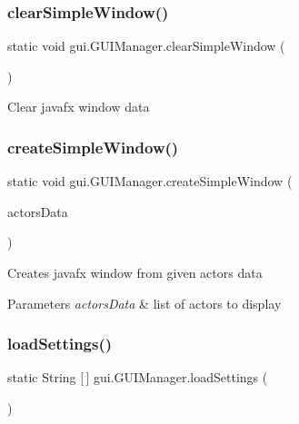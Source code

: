 \subsubsection{\texorpdfstring{clear\+Simple\+Window()}{clearSimpleWindow()}}
{\footnotesize\ttfamily static void gui.\+G\+U\+I\+Manager.\+clear\+Simple\+Window (\begin{DoxyParamCaption}{ }\end{DoxyParamCaption})\hspace{0.3cm}{\ttfamily [static]}}

Clear javafx window data \mbox{\label{classgui_1_1_g_u_i_manager_ad0f98411aba9a8fe15a3965bee9a004d}} 
\subsubsection{\texorpdfstring{create\+Simple\+Window()}{createSimpleWindow()}}
{\footnotesize\ttfamily static void gui.\+G\+U\+I\+Manager.\+create\+Simple\+Window (\begin{DoxyParamCaption}\item[{Array\+List$<$ Simple\+Actor $>$}]{actors\+Data }\end{DoxyParamCaption})\hspace{0.3cm}{\ttfamily [static]}}

Creates javafx window from given actors data 
\begin{DoxyParams}{Parameters}
{\em actors\+Data} & list of actors to display \\
\hline
\end{DoxyParams}
\mbox{\label{classgui_1_1_g_u_i_manager_a4befd69398d555a850a3e14afcb29ebe}} 
\subsubsection{\texorpdfstring{load\+Settings()}{loadSettings()}}
{\footnotesize\ttfamily static String \mbox{[}$\,$\mbox{]} gui.\+G\+U\+I\+Manager.\+load\+Settings (\begin{DoxyParamCaption}{ }\end{DoxyParamCaption})\hspace{0.3cm}{\ttfamily [static]}}

